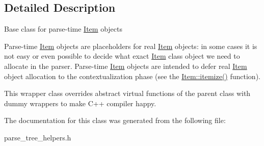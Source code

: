 \subsection{Detailed Description}
Base class for parse-\/time \mbox{\hyperlink{classItem}{Item}} objects

Parse-\/time \mbox{\hyperlink{classItem}{Item}} objects are placeholders for real \mbox{\hyperlink{classItem}{Item}} objects\+: in some cases it is not easy or even possible to decide what exact \mbox{\hyperlink{classItem}{Item}} class object we need to allocate in the parser. Parse-\/time \mbox{\hyperlink{classItem}{Item}} objects are intended to defer real \mbox{\hyperlink{classItem}{Item}} object allocation to the contextualization phase (see the \mbox{\hyperlink{classItem_a0757839d09aa77bfd92bfe071f257ae9}{Item\+::itemize()}} function).

This wrapper class overrides abstract virtual functions of the parent class with dummy wrappers to make C++ compiler happy. 

The documentation for this class was generated from the following file\+:\begin{DoxyCompactItemize}
\item 
parse\+\_\+tree\+\_\+helpers.\+h\end{DoxyCompactItemize}
